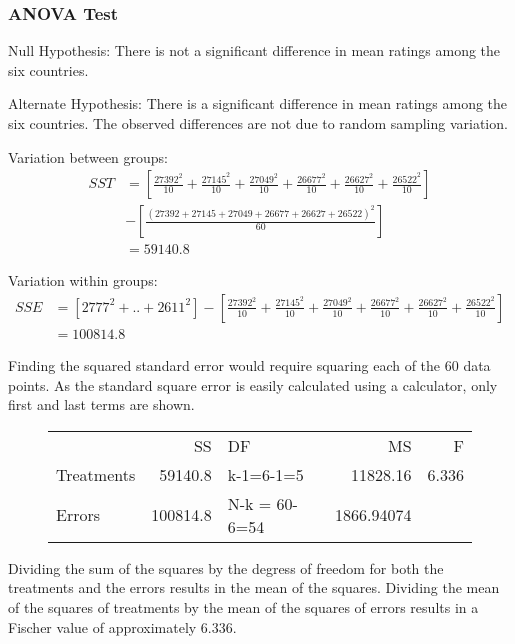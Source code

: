 \documentclass[12pt, titlepage]{article}
\begin{document}
\subsubsection{ANOVA Test}
Null Hypothesis: There is not a significant difference in mean ratings among the six countries. 

Alternate Hypothesis: There is a significant difference in mean ratings among the six countries. The observed differences are not due to random sampling variation.

Variation between groups:
\begin{equation*}
\begin{split}
    SST & = [\frac{27392^{2}}{10} + \frac{27145^{2}}{10} + \frac{27049^{2}}{10} + \frac{26677^{2}}{10} + \frac{26627^{2}}{10} + \frac{26522^{2}}{10}] \\ 
    & - [\frac{(27392+27145+27049+26677+26627+26522)^{2}}{60}] \\
    & = 59140.8 
\end{split}
\end{equation*}

Variation within groups:
\begin{equation*}
\begin{split}
    SSE & = [2777^{2} + .. + 2611^{2}] - [\frac{27392^{2}}{10} + \frac{27145^{2}}{10} + \frac{27049^{2}}{10} + \frac{26677^{2}}{10} + \frac{26627^{2}}{10} + \frac{26522^{2}}{10}] \\
    & = 100814.8 
\end{split}
\end{equation*}

Finding the squared standard error would require squaring each of the 60 data points. As the standard square error is easily calculated using a calculator, only first and last terms are shown.
\begin{figure}[H]
\centering
\begin{tabular}{lrlrr}
 & SS & DF & MS & F\\
Treatments & 59140.8 & k-1=6-1=5 & 11828.16 & 6.336\\
Errors & 100814.8 & N-k = 60-6=54 & 1866.94074 & \\
\end{tabular}
\end{figure}
Dividing the sum of the squares by the degress of freedom for both the treatments and the errors results in the mean of the squares. Dividing the mean of the squares of treatments by the mean of the squares of errors results in a Fischer value of approximately 6.336.
\end{document}
